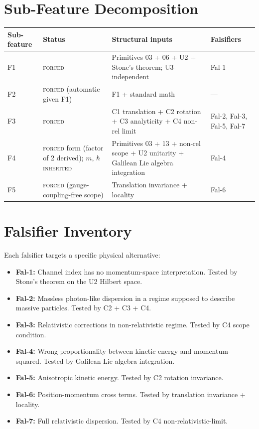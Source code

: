 \documentclass[11pt,a4paper]{article}
\begin{document}
\section{Sub-Feature Decomposition}\label{sec:decomposition}

\begin{center}
\begin{tabular}{p{3.0cm}p{3.5cm}p{6.0cm}p{2.5cm}}
\hline
Sub-feature & Status & Structural inputs & Falsifiers \\
\hline
F1 & \textsc{forced} & Primitives 03 + 06 + U2 + Stone's theorem; U3-independent & Fal-1 \\
F2 & \textsc{forced} (automatic given F1) & F1 + standard math & --- \\
F3 & \textsc{forced} & C1 translation + C2 rotation + C3 analyticity + C4 non-rel limit & Fal-2, Fal-3, Fal-5, Fal-7 \\
F4 & \textsc{forced} form (factor of 2 derived); $m$, $\hbar$ \textsc{inherited} & Primitives 03 + 13 + non-rel scope + U2 unitarity + Galilean Lie algebra integration & Fal-4 \\
F5 & \textsc{forced} (gauge-coupling-free scope) & Translation invariance + locality & Fal-6 \\
\hline
\end{tabular}
\end{center}

\section{Falsifier Inventory}\label{sec:falsifiers}

Each falsifier targets a specific physical alternative:
\begin{itemize}
  \item \textbf{Fal-1:} Channel index has no momentum-space interpretation. Tested by Stone's theorem on the U2 Hilbert space.
  \item \textbf{Fal-2:} Massless photon-like dispersion in a regime supposed to describe massive particles. Tested by C2 + C3 + C4.
  \item \textbf{Fal-3:} Relativistic corrections in non-relativistic regime. Tested by C4 scope condition.
  \item \textbf{Fal-4:} Wrong proportionality between kinetic energy and momentum-squared. Tested by Galilean Lie algebra integration.
  \item \textbf{Fal-5:} Anisotropic kinetic energy. Tested by C2 rotation invariance.
  \item \textbf{Fal-6:} Position-momentum cross terms. Tested by translation invariance + locality.
  \item \textbf{Fal-7:} Full relativistic dispersion. Tested by C4 non-relativistic-limit.
\end{itemize}
\end{document}
